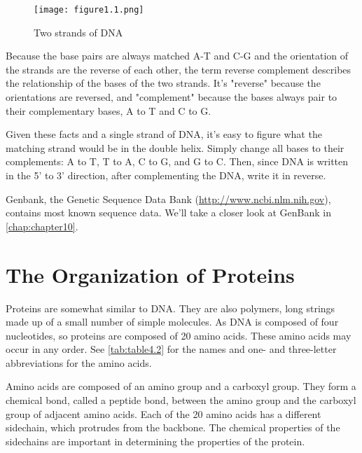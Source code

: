 \begin{figure}
  \centering
  \texttt{[image: figure1.1.png]}
  \caption{Two strands of DNA}
  \label{fig:figure1.1}
\end{figure}

Because the base pairs are always matched A-T and C-G and the orientation of the strands are the reverse of each other, the term reverse complement describes the relationship of the bases of the two strands. It's "reverse" because the orientations are reversed, and "complement" because the bases always pair to their complementary bases, A to T and C to G.

Given these facts and a single strand of DNA, it's easy to figure what the matching strand would be in the double helix. Simply change all bases to their complements: A to T, T to A, C to G, and G to C.  Then, since DNA is written in the 5' to 3' direction, after complementing the DNA, write it in reverse.

Genbank, the Genetic Sequence Data Bank (\href{http://www.ncbi.nlm.nih.gov}{http://www.ncbi.nlm.nih.gov}), contains most known sequence data. We'll take a closer look at GenBank in \autoref{chap:chapter10}. 

\section{The Organization of Proteins}
Proteins are somewhat similar to DNA. They are also polymers, long strings made up of a small number of simple molecules. As DNA is composed of four nucleotides, so proteins are composed of 20 amino acids. These amino acids may occur in any order. See \autoref{tab:table4.2} for the names and one- and three-letter abbreviations for the amino acids.  

Amino acids are composed of an amino group and a carboxyl group. They form a chemical bond, called a peptide bond, between the amino group and the carboxyl group of adjacent amino acids. Each of the 20 amino acids has a different sidechain, which protrudes from the backbone. The chemical properties of the sidechains are important in determining the properties of the protein.


